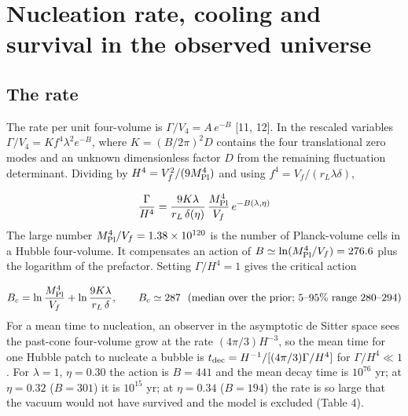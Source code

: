 \documentclass[11pt,a4paper]{article}
\begin{document}
\section{Nucleation rate, cooling and survival in the observed universe}
\subsection{The rate}
The rate per unit four-volume is $\Gamma/V_4 = A\,e^{-B}$ [11, 12]. In the rescaled variables $\Gamma/V_4 = K f^4\lambda^2 e^{-B}$, where $K = (B/2\pi)^2 D$ contains the four translational zero modes and an unknown dimensionless factor $D$ from the remaining fluctuation determinant. Dividing by $H^4 = V_f^2/(9M_{\rm Pl}^4)$ and using $f^4 = V_f/(r_L\lambda\delta)$,

\begin{equation}
\frac{\Gamma}{H^4}=\frac{9K\lambda}{r_L\,\delta(\eta)}\,\frac{M_{\rm Pl}^4}{V_f}\,e^{-B(\lambda,\eta)}
\end{equation}
The large number $M_{\rm Pl}^4/V_f = 1.38\times10^{120}$ is the number of Planck-volume cells in a Hubble four-volume. It compensates an action of $B \simeq \ln(M_{\rm Pl}^4/V_f) = 276.6$ plus the logarithm of the prefactor. Setting $\Gamma/H^4 = 1$ gives the critical action

\begin{equation}
B_c=\ln\frac{M_{\rm Pl}^4}{V_f}+\ln\frac{9K\lambda}{r_L\,\delta},\qquad B_c\simeq 287\ \ (\text{median over the prior; 5--95\% range }280\text{--}294)
\end{equation}
For a mean time to nucleation, an observer in the asymptotic de Sitter space sees the past-cone four-volume grow at the rate $(4\pi/3)H^{-3}$, so the mean time for one Hubble patch to nucleate a bubble is $t_{\rm dec} = H^{-1}/[(4\pi/3)\Gamma/H^4]$ for $\Gamma/H^4\ll1$. For $\lambda=1$, $\eta=0.30$ the action is $B=441$ and the mean decay time is $10^{76}$ yr; at $\eta=0.32$ ($B=301$) it is $10^{15}$ yr; at $\eta=0.34$ ($B=194$) the rate is so large that the vacuum would not have survived and the model is excluded (Table 4).
\end{document}
